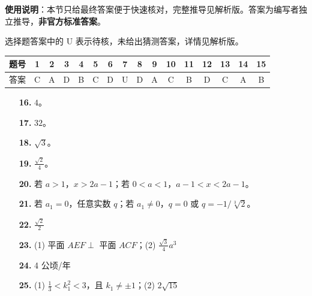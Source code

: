 
\begin{gknotice}
\textbf{使用说明}：本节只给最终答案便于快速核对，完整推导见解析版。答案为编写者独立推导，\textbf{非官方标准答案}。
\end{gknotice}

\begin{gknotice}
选择题答案中的 U 表示待核，未给出猜测答案，详情见解析版。
\end{gknotice}

\begin{center}\begin{tabular}{cccccccccccccccc}
\toprule
题号 & 1 & 2 & 3 & 4 & 5 & 6 & 7 & 8 & 9 & 10 & 11 & 12 & 13 & 14 & 15 \\
\midrule
答案 & C & A & D & B & C & D & U & D & A & C & B & D & C & A & B \\
\bottomrule
\end{tabular}\end{center}

\begin{itemize}[leftmargin=2.6em]
  \item[\textbf{16.}] $4$。
  \item[\textbf{17.}] $32$。
  \item[\textbf{18.}] $\sqrt3$。
  \item[\textbf{19.}] $\frac{\sqrt2}{4}$。
\end{itemize}

\begin{itemize}[leftmargin=2.6em]
  \item[\textbf{20.}] 若 $a>1$，$x>2a-1$；若 $0<a<1$，$a-1<x<2a-1$。
  \item[\textbf{21.}] 若 $a_1=0$，任意实数 $q$；若 $a_1\ne0$，$q=0$ 或 $q=-1/\sqrt[3]{2}$。
  \item[\textbf{22.}] $\frac{\sqrt2}{2}$
  \item[\textbf{23.}] (1) 平面 $AEF\perp$ 平面 $ACF$；(2) $\frac{\sqrt3}{4}a^3$
  \item[\textbf{24.}] 4 公顷/年
  \item[\textbf{25.}] (1) $\frac13<k_1^2<3$，且 $k_1\ne\pm1$；(2) $2\sqrt{15}$
\end{itemize}
